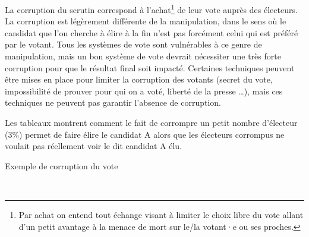 \documentclass[../report]{subfiles}
\begin{document}
  La corruption du scrutin correspond à l'achat\footnote{Par achat on entend
  tout échange visant à limiter le choix libre du vote allant d'un petit avantage à la menace 
  de mort sur le/la votant·e ou ses proches.} de leur vote auprès des électeurs.
  La corruption est légèrement différente de la manipulation, dans le sens où le candidat
  que l'on cherche à élire à la fin n'est pas forcément celui qui est préféré par le votant.
  Tous les systèmes de vote sont vulnérables à ce genre de manipulation, mais un bon système de 
  vote devrait nécessiter une très forte corruption pour que le résultat final soit impacté.
  Certaines techniques peuvent être mises en place pour limiter la corruption des votants (secret
  du vote, impossibilité de prouver pour qui on a voté, liberté de la presse …), mais 
  ces techniques ne peuvent pas garantir l'absence de corruption.
  
  Les tableaux  montrent comment le fait de corrompre un petit nombre d'électeur 
  (3\%) permet de faire élire le candidat A alors que les électeurs corrompus ne voulait pas réellement voir le dit candidat A élu.
  
  
  \begin{table}[h]
  	\begin{center}
  		\caption{Exemple de corruption du vote}%
  		\label{fig:critere:corruption:example}
  		\\[1em]
  	\end{center}
  \end{table}
  
\end{document}
